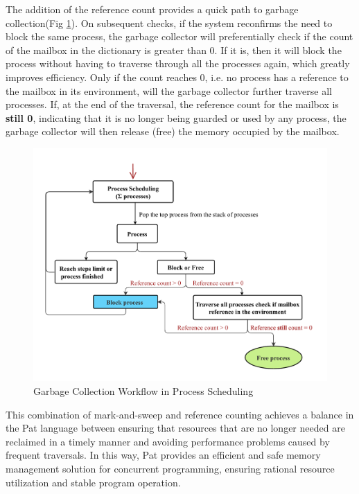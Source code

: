 \documentclass{l4proj}
\begin{document}
The addition of the reference count provides a quick path to garbage collection(Fig \ref{fig:gc1}). On subsequent checks, if the system reconfirms the need to block the same process, the garbage collector will preferentially check if the count of the mailbox in the dictionary is greater than 0. If it is, then it will block the process without having to traverse through all the processes again, which greatly improves efficiency. Only if the count reaches 0, i.e. no process has a reference to the mailbox in its environment, will the garbage collector further traverse all processes. If, at the end of the traversal, the reference count for the mailbox is \textbf{still 0}, indicating that it is no longer being guarded or used by any process, the garbage collector will then release (free) the memory occupied by the mailbox.

\begin{figure}[h]
    \centering
    \includegraphics[width=0.8\linewidth]{dissertation/images/gc.pdf}    
    \caption{ 
    Garbage Collection Workflow in Process Scheduling
    }
    \label{fig:gc1} 
\end{figure}

This combination of mark-and-sweep and reference counting achieves a balance in the Pat language between ensuring that resources that are no longer needed are reclaimed in a timely manner and avoiding performance problems caused by frequent traversals. In this way, Pat provides an efficient and safe memory management solution for concurrent programming, ensuring rational resource utilization and stable program operation.




\end{document}
